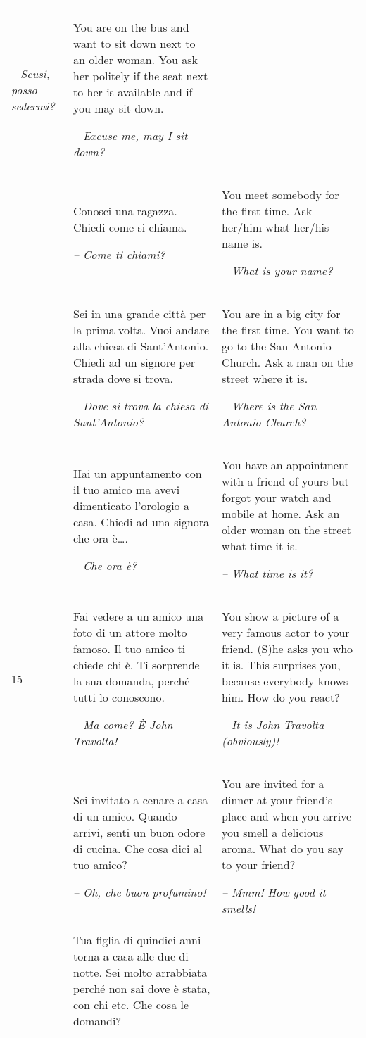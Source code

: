 \begin{xltabular}{\textwidth}{lQQ}
-- \textit{Scusi, posso sedermi?} & You are on the bus and want to sit down next to an older woman. You ask her politely if the seat next to her is available and if you may sit down.

{\itshape -- Excuse me, may I sit down?}\\
 & Conosci una ragazza. Chiedi come si chiama.

{\itshape -- Come ti chiami?} & You meet somebody for the first time. Ask her/him what her/his name is.

{\itshape -- What is your name?}\\
 & Sei in una grande città per la prima volta. Vuoi andare alla chiesa di Sant’Antonio. Chiedi ad un signore per strada dove si trova.

{\itshape -- Dove si trova la chiesa di Sant’Antonio?} & You are in a big city for the first time. You want to go to the San Antonio Church. Ask a man on the street where it is.

{\itshape -- Where is the San Antonio Church?}\\
 & Hai un appuntamento con il tuo amico ma avevi dimenticato l'orologio a casa. Chiedi ad una signora che ora è….

\textit{-- Che ora è?} & You have an appointment with a friend of yours but forgot your watch and mobile at home. Ask an older woman on the street what time it is.

{\itshape -- What time is it?}\\
15 & Fai vedere a un amico una foto di un attore molto famoso. Il tuo amico ti chiede chi è. Ti sorprende la sua domanda, perché tutti lo conoscono.

{\itshape -- Ma come? È John Travolta!} & You show a picture of a very famous actor to your friend. (S)he asks you who it is. This surprises you, because everybody knows him. How do you react?

{\itshape -- It is John Travolta (obviously)!}\\
 & Sei invitato a cenare a casa di un amico. Quando arrivi, senti un buon odore di cucina. Che cosa dici al tuo amico?

{\itshape -- Oh, che buon profumino!} & You are invited for a dinner at your friend’s place and when you arrive you smell a delicious aroma. What do you say to your friend?

{\itshape -- Mmm! How good it smells!}\\
 & Tua figlia di quindici anni torna a casa alle due di notte. Sei molto arrabbiata perché non sai dove è stata, con chi etc. Che cosa le domandi?


\end{xltabular}
